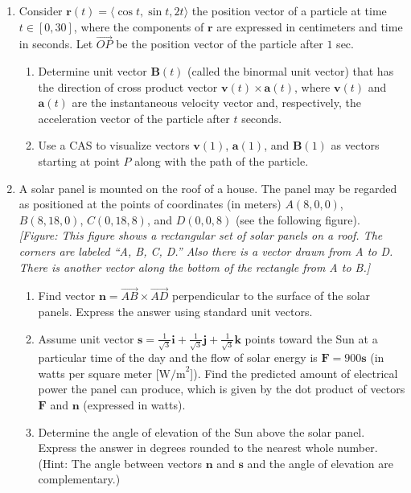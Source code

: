 \documentclass{exercises}
\begin{document}
\begin{enumerate}[resume]
\item \techrequired Consider $\mathbf{r}(t)=\langle \cos t,\sin t,2t\rangle$ the position vector of a particle at time $t\in[0,30]$, where the components of $\mathbf{r}$ are expressed in centimeters and time in seconds. Let $\overset{\to}{OP}$ be the position vector of the particle after $1$ sec.
\begin{enumerate}[label=(\alph*)]
  \item Determine unit vector $\mathbf{B}(t)$ (called the binormal unit vector) that has the direction of cross product vector $\mathbf{v}(t)\times \mathbf{a}(t)$, where $\mathbf{v}(t)$ and $\mathbf{a}(t)$ are the instantaneous velocity vector and, respectively, the acceleration vector of the particle after $t$ seconds.
  \item Use a CAS to visualize vectors $\mathbf{v}(1)$, $\mathbf{a}(1)$, and $\mathbf{B}(1)$ as vectors starting at point $P$ along with the path of the particle.
\end{enumerate}
\item A solar panel is mounted on the roof of a house. The panel may be regarded as positioned at the points of coordinates (in meters) $A(8,0,0)$, $B(8,18,0)$, $C(0,18,8)$, and $D(0,0,8)$ (see the following figure). \\ \textit{[Figure: This figure shows a rectangular set of solar panels on a roof. The corners are labeled ``A, B, C, D.'' Also there is a vector drawn from A to D. There is another vector along the bottom of the rectangle from A to B.]}
\begin{enumerate}[label=(\alph*)]
  \item Find vector $\mathbf{n}=\overset{\to}{AB}\times \overset{\to}{AD}$ perpendicular to the surface of the solar panels. Express the answer using standard unit vectors.
  \item Assume unit vector $\mathbf{s}=\frac{1}{\sqrt{3}}\mathbf{i}+\frac{1}{\sqrt{3}}\mathbf{j}+\frac{1}{\sqrt{3}}\mathbf{k}$ points toward the Sun at a particular time of the day and the flow of solar energy is $\mathbf{F}=900\mathbf{s}$ (in watts per square meter [$\text{W/m}^{2}$]). Find the predicted amount of electrical power the panel can produce, which is given by the dot product of vectors $\mathbf{F}$ and $\mathbf{n}$ (expressed in watts).
  \item Determine the angle of elevation of the Sun above the solar panel. Express the answer in degrees rounded to the nearest whole number. (Hint: The angle between vectors $\mathbf{n}$ and $\mathbf{s}$ and the angle of elevation are complementary.)
\end{enumerate}
\end{enumerate}
\end{document}
